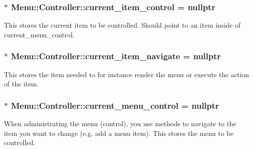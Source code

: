 \subsubsection[{\texorpdfstring{current\+\_\+item\+\_\+control}{current_item_control}}]{$\ast$ Menu\+::\+Controller\+::current\+\_\+item\+\_\+control = nullptr\hspace{0.3cm}{\ttfamily [private]}}\hypertarget{class_menu_1_1_controller_a288e26b1efe4fd953b5514de72a1c508}{}\label{class_menu_1_1_controller_a288e26b1efe4fd953b5514de72a1c508}
This stores the current item to be controlled. Should point to an item inside of current\+\_\+menu\+\_\+control. 
\subsubsection[{\texorpdfstring{current\+\_\+item\+\_\+navigate}{current_item_navigate}}]{$\ast$ Menu\+::\+Controller\+::current\+\_\+item\+\_\+navigate = nullptr\hspace{0.3cm}{\ttfamily [private]}}\hypertarget{class_menu_1_1_controller_a6dfb1678cc8fd44570806ff680ac27cf}{}\label{class_menu_1_1_controller_a6dfb1678cc8fd44570806ff680ac27cf}
This stores the item needed to for instance render the menu or execute the action of the item. 
\subsubsection[{\texorpdfstring{current\+\_\+menu\+\_\+control}{current_menu_control}}]{$\ast$ Menu\+::\+Controller\+::current\+\_\+menu\+\_\+control = nullptr\hspace{0.3cm}{\ttfamily [private]}}\hypertarget{class_menu_1_1_controller_a912ad4ad6b2c30e7cddf44547585a909}{}\label{class_menu_1_1_controller_a912ad4ad6b2c30e7cddf44547585a909}
When administrating the menu (control), you use methods to navigate to the item you want to change (e.\+g. add a menu item). This stores the menu to be controlled. 

